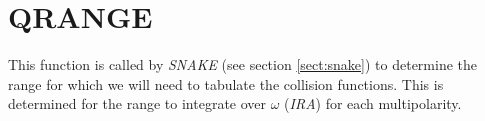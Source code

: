 \section{QRANGE}
\label{sect:qrange}

\noindent This function is called by {\em SNAKE} (see section
\ref{sect:snake}) to determine the range for which we will need to tabulate
the collision functions. This is determined for the range to integrate over
$\omega$ ({\em IRA}) for each multipolarity.\\
